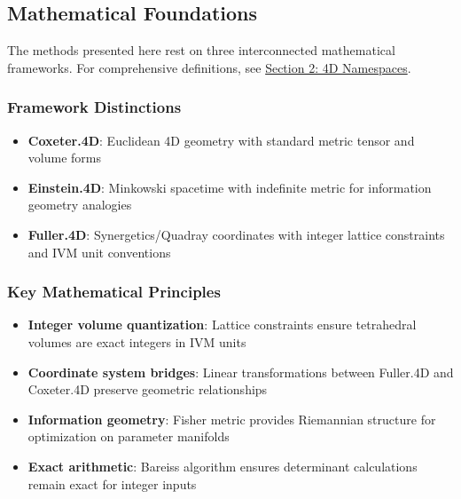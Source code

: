 \documentclass[
  10pt,
]{article}
\providecommand{\tightlist}{%
  \setlength{\itemsep}{0pt}\setlength{\parskip}{0pt}}
\begin{document}
\hypertarget{mathematical-foundations}{%
\subsection{Mathematical Foundations}\label{mathematical-foundations}}

The methods presented here rest on three interconnected mathematical
frameworks. For comprehensive definitions, see
\href{02_4d_namespaces.md}{Section 2: 4D Namespaces}.

\hypertarget{framework-distinctions}{%
\subsubsection{Framework Distinctions}\label{framework-distinctions}}

\begin{itemize}
\tightlist
\item
  \textbf{Coxeter.4D}: Euclidean 4D geometry with standard metric tensor
  and volume forms
\item
  \textbf{Einstein.4D}: Minkowski spacetime with indefinite metric for
  information geometry analogies\\
\item
  \textbf{Fuller.4D}: Synergetics/Quadray coordinates with integer
  lattice constraints and IVM unit conventions
\end{itemize}

\hypertarget{key-mathematical-principles}{%
\subsubsection{Key Mathematical
Principles}\label{key-mathematical-principles}}

\begin{itemize}
\tightlist
\item
  \textbf{Integer volume quantization}: Lattice constraints ensure
  tetrahedral volumes are exact integers in IVM units
\item
  \textbf{Coordinate system bridges}: Linear transformations between
  Fuller.4D and Coxeter.4D preserve geometric relationships
\item
  \textbf{Information geometry}: Fisher metric provides Riemannian
  structure for optimization on parameter manifolds
\item
  \textbf{Exact arithmetic}: Bareiss algorithm ensures determinant
  calculations remain exact for integer inputs
\end{itemize}
\end{document}
